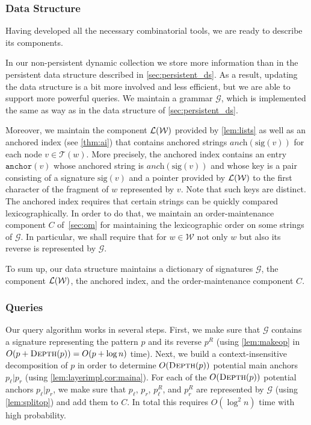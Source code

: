 \documentclass[a4paper]{article}
\theoremstyle{remark}
\newcommand{\depth}{\textsc{Depth}}
\newcommand{\grammar}{\mathcal{G}}
\newcommand{\sanch}{\textit{anch}}
\newcommand{\stree}{\mathcal{T}}
\newcommand{\ussig}{\mathrm{sig}}
\newcommand{\coll}{\mathcal{W}}
\newcommand{\itanch}{\mathtt{anchor}}
\begin{document}
\subsubsection{Data Structure}
Having developed all the necessary combinatorial tools, we are ready to describe its components.

In our non-persistent dynamic collection we store more information than in the persistent data structure described in \cref{sec:persistent_ds}.
As a result, updating the data structure is a bit more involved and less efficient, but we are able to support more powerful queries.
We maintain a grammar $\grammar$, which is implemented the same as way as in the data structure of \cref{sec:persistent_ds}.


Moreover, we maintain the component $\lists(\coll)$ provided by \cref{lem:lists} as well as an anchored index (see \cref{thm:ai}) that contains anchored strings $\sanch(\ussig(v))$ for each node $v\in \stree(w)$.
More precisely, the anchored index contains an entry $\itanch(v)$ whose anchored string is $\sanch(\ussig(v))$
and whose key is a pair consisting of a signature $\ussig(v)$ and a pointer provided by $\lists(\coll)$ to the first character
of the fragment of $w$ represented by $v$. Note that such keys are distinct.
The anchored index requires that certain strings can be quickly compared lexicographically.
In order to do that, we maintain an order-maintenance component $C$ of~\cref{sec:om} for maintaining the lexicographic order
on some strings of $\grammar$. In particular, we shall require that for $w\in \coll$ not only $w$ but also its reverse
is represented by $\grammar$.

To sum up, our data structure maintains a dictionary of signatures $\grammar$,  the component $\lists(\coll)$,
the anchored index, and the order-maintenance component $C$.
\subsubsection{Queries}

Our query algorithm works in several steps. First, we make sure that $\grammar$ contains a signature representing the pattern $p$ and its reverse $p^R$ (using \cref{lem:makeop} in $O(p+\depth(p)) = O(p+\log n)$ time).
Next, we build a context-insensitive decomposition of $p$ in order to determine $O(\depth(p))$ potential main anchors $p_\ell|p_r$ (using \cref{lem:layerimpl,cor:maina}).
For each of the $O(\depth(p))$ potential anchors $p_\ell|p_r$, we make sure that $p_\ell$, $p_r$, $p_\ell^R$, and $p_r^R$
are represented by $\grammar$ (using \cref{lem:splitop}) and add them to $C$.
In total this requires $O(\log^2 n)$ time with high probability.
\end{document}
